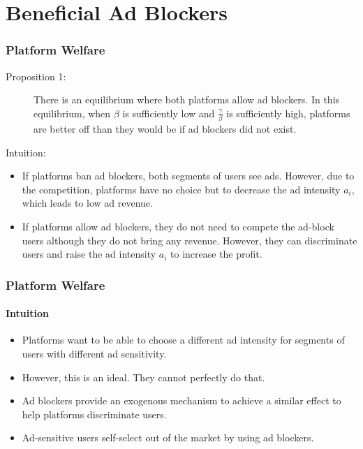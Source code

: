 \documentclass{beamer}
\newcommand{\hl}[1]{\textcolor{myblue}{#1}}
\begin{document}
\section{Beneficial Ad Blockers}
\begin{frame}
    \frametitle{Platform Welfare}
    \begin{description}
        \item[Proposition 1:] 
            There is an equilibrium where \hl{both platforms allow ad blockers}. 
            In this equilibrium, when $\beta$ is sufficiently low and 
            $\frac{\gamma}{\beta}$ is sufficiently high, 
            platforms are better off than they would be if ad blockers did not exist.
        \item[Intuition:]
   \end{description}
            \begin{itemize}
                \item If platforms ban ad blockers, both segments of users see ads.
                However, due to the competition, platforms have no choice but to
                decrease the ad intensity $a_i$, which leads to low ad revenue.
                \item If platforms allow ad blockers, \hl{they do not need to compete the
                ad-block users} although they do not bring any revenue. However,
                they can \hl{discriminate users and raise the ad intensity $a_i$}
                to increase the profit.
            \end{itemize}
\end{frame}

\begin{frame}
    \frametitle{Platform Welfare}
    \framesubtitle{Intuition}
    \begin{itemize}
        \item Platforms want to be able to choose a different ad intensity 
            for segments of users with different ad sensitivity.
        \item However, this is an ideal. They cannot perfectly do that.
        \item \hl{Ad blockers provide an exogenous mechanism 
                to achieve a similar effect
            to help platforms discriminate users.}
        \item Ad-sensitive users self-select out of the market by using ad blockers.
    \end{itemize}
\end{frame}
\end{document}
